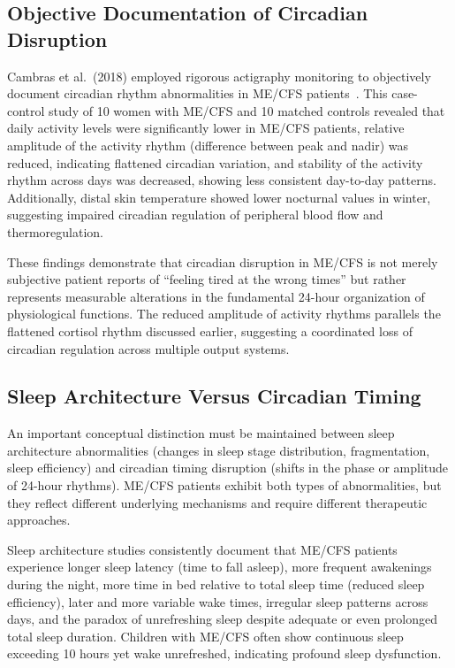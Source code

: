 \subsection{Objective Documentation of Circadian Disruption}

\begin{observation}
\label{obs:circadian-disruption}
Cambras et al.\ (2018) employed rigorous actigraphy monitoring to objectively document circadian rhythm abnormalities in ME/CFS patients~\cite{cambras2018circadian}. This case-control study of 10 women with ME/CFS and 10 matched controls revealed that daily activity levels were significantly lower in ME/CFS patients, relative amplitude of the activity rhythm (difference between peak and nadir) was reduced, indicating flattened circadian variation, and stability of the activity rhythm across days was decreased, showing less consistent day-to-day patterns. Additionally, distal skin temperature showed lower nocturnal values in winter, suggesting impaired circadian regulation of peripheral blood flow and thermoregulation.
\end{observation}

These findings demonstrate that circadian disruption in ME/CFS is not merely subjective patient reports of ``feeling tired at the wrong times'' but rather represents measurable alterations in the fundamental 24-hour organization of physiological functions. The reduced amplitude of activity rhythms parallels the flattened cortisol rhythm discussed earlier, suggesting a coordinated loss of circadian regulation across multiple output systems.

\subsection{Sleep Architecture Versus Circadian Timing}

An important conceptual distinction must be maintained between sleep architecture abnormalities (changes in sleep stage distribution, fragmentation, sleep efficiency) and circadian timing disruption (shifts in the phase or amplitude of 24-hour rhythms). ME/CFS patients exhibit both types of abnormalities, but they reflect different underlying mechanisms and require different therapeutic approaches.

Sleep architecture studies consistently document that ME/CFS patients experience longer sleep latency (time to fall asleep), more frequent awakenings during the night, more time in bed relative to total sleep time (reduced sleep efficiency), later and more variable wake times, irregular sleep patterns across days, and the paradox of unrefreshing sleep despite adequate or even prolonged total sleep duration. Children with ME/CFS often show continuous sleep exceeding 10 hours yet wake unrefreshed, indicating profound sleep dysfunction.

